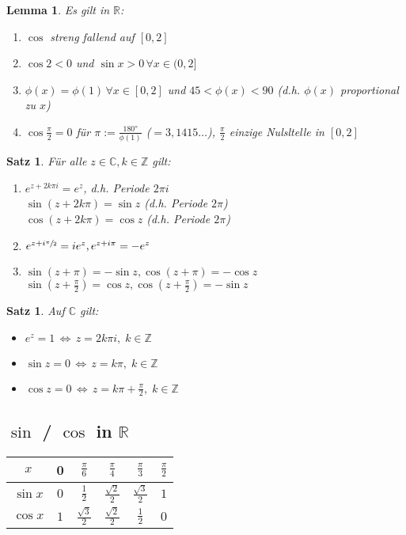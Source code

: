 \documentclass[ngerman,a4paper]{report}
\theoremstyle{break}
\newtheorem{lemma}[theorem]{Lemma}
\newtheorem{satz}[theorem]{Satz}
\begin{document}
\begin{lemma}
	Es gilt in $\mathbb{R}$:
	\begin{enumerate}[label={\arabic*)}]
		\item $\cos$ streng fallend auf $[0,2]$
		\item $\cos 2 < 0$ und $\sin x > 0\,\forall x\in (0,2]$
		\item $\phi(x) = \phi(1) \,\forall x\in [0,2]$ und $45 < \phi(x) < 90$ (d.h. $\phi(x)$ proportional zu $x$)
		\item $\cos \frac{\pi}{2} = 0$ für $\pi := \frac{180°}{\phi(1)}$ ($=3,1415\dotsc$), $\frac{\pi}{2}$ einzige Nulsltelle in $[0,2]$
	\end{enumerate}
\end{lemma}
\begin{satz}
	Für alle $z\in\mathbb{C}, k\in\mathbb{Z}$ gilt:
	\begin{enumerate}[label={\arabic*)}]
		\item $e^{z+2k\pi i} = e^z$, d.h. Periode $2\pi i$\\
		$\sin(z+2k\pi) = \sin z$ (d.h. Periode $2\pi$)\\
		$\cos(z+2k\pi) = \cos z$ (d.h. Periode $2\pi$)
		\item $e^{z+i\sfrac{\pi}{2}} = ie^z, e^{z+i\pi} = -e^z$
		\item $\sin(z+\pi) = -\sin z, \cos(z+\pi) = -\cos z$\\
		$\sin\left(z+\frac{\pi}{2}\right) = \cos z, \cos\left(z+\frac{\pi}{2}\right) = -\sin z$
	\end{enumerate}
\end{satz}

\begin{satz}
	Auf $\mathbb{C}$ gilt:
	\begin{itemize}
		\item $e^z = 1 \,\Leftrightarrow\,z=2k\pi i,\;k\in\mathbb{Z}$
		\item $\sin z = 0\,\Leftrightarrow\,z=k\pi,\;k\in\mathbb{Z}$
		\item $\cos z = 0\,\Leftrightarrow\,z =k\pi + \frac{\pi}{2},\;k\in\mathbb{Z}$
	\end{itemize}
\end{satz}
\subsection*{$\sin$ / $\cos$ in $\mathbb{R}$}
\begin{centering}
	\begin{tabular}{c|ccccc}
		\toprule
		$x$ & 0 & $\frac{\pi}{6}$ & $\frac{\pi}{4}$ & $\frac{\pi}{3}$ & $\frac{\pi}{2}$ \\
		\midrule
		$\sin x$ & $0$ & $\frac{1}{2}$ & $\frac{\sqrt{2}}{2}$ & $\frac{\sqrt{3}}{2}$ & $1$ \\
		$\cos x$ & $1$ & $\frac{\sqrt{3}}{2}$ & $\frac{\sqrt{2}}{2}$ & $\frac{1}{2}$ & $0$ \\
		\bottomrule
	\end{tabular}
\end{centering}
\end{document}
